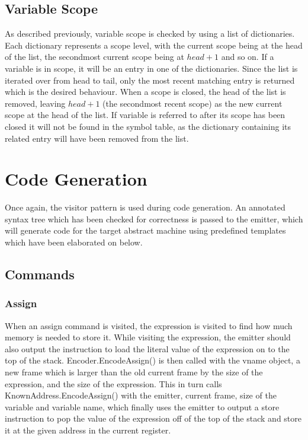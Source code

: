 \documentclass{article}
\begin{document}
\subsection{Variable Scope}
As described previously, variable scope is checked by using a list of dictionaries. Each dictionary represents a scope level, with the current scope being at the head of the list, the secondmost current scope being at $head + 1$ and so on. If a variable is in scope, it will be an entry in one of the dictionaries. Since the list is iterated over from head to tail, only the most recent matching entry is returned which is the desired behaviour. When a scope is closed, the head of the list is removed, leaving $head + 1$ (the secondmost recent scope) as the new current scope at the head of the list. If variable is referred to after its scope has been closed it will not be found in the symbol table, as the dictionary containing its related entry will have been removed from the list.

\section{Code Generation}
Once again, the visitor pattern is used during code generation. An annotated syntax tree which has been checked for correctness is passed to the emitter, which will generate code for the target abstract machine using predefined templates which have been elaborated on below.

\subsection{Commands}
\subsubsection{Assign}
When an assign command is visited, the expression is visited to find how much memory is needed to store it. While visiting the expression, the emitter should also output the instruction to load the literal value of the expression on to the top of the stack. Encoder.EncodeAssign() is then called with the vname object, a new frame which is larger than the old current frame by the size of the expression, and the size of the expression. This in turn calls KnownAddress.EncodeAssign() with the emitter, current frame, size of the variable and variable name, which finally uses the emitter to output a store instruction to pop the value of the expression off of the top of the stack and store it at the given address in the current register.
\end{document}
